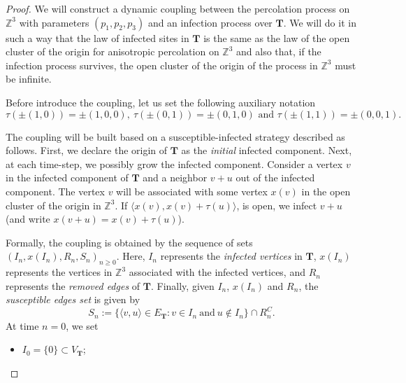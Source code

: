 \documentclass[10pt,a4paper]{amsart}
\newcommand{\Z}{\mathbb{Z}}
\begin{document}
\begin{proof}
We will construct a dynamic coupling between the percolation process on $\Z^{3}$ with parameters $(p_1,p_2, p_3)$  and an infection process over $\mathbf{T}$.  We will do it in such a way that the law of infected sites in $\mathbf{T}$ is the same as the law of the open cluster of the origin for anisotropic percolation on $\Z^3$ and also that, if the infection process survives, the open cluster of the origin of the process in $\Z^3$ must be infinite. 

Before introduce the coupling, let us set the following auxiliary notation
\begin{equation}\label{eq:tau}
\tau(\pm(1,0))=\pm (1,0,0), \: \tau(\pm(0,1))=\pm (0,1,0) \mbox{ and } \tau(\pm(1,1))=\pm (0,0,1) .
\end{equation}

The coupling will be built based on a susceptible-infected strategy described as follows. First, we declare  the origin of $\mathbf{T}$ as the \textit{initial} infected component. Next, at each time-step, we possibly grow the infected component. %
Consider a vertex $v$ in the infected component of $\mathbf{T}$ and a neighbor $v+u$ out of the infected component. The vertex $v$ will be associated with some vertex $x(v)$ in the  open cluster of the origin in $\Z^3$. If $\langle x(v), x(v)+\tau(u) \rangle$,  is open, we infect $v+u$  (and write $x(v+u) = x(v) + \tau(u)$).





Formally, the coupling is obtained by the sequence of sets $(I_n, x(I_n), R_n, S_n)_{n \geq 0}$. Here, $I_n$ represents the \textit{infected vertices} in $\mathbf{T}$, $x(I_n)$ represents the vertices in $\Z^{3}$ associated with the infected vertices, and $R_n$ represents the \textit{removed edges} of $\mathbf{T}$. Finally, given $I_n$, $x(I_n)$ and $R_n$, the \textit{susceptible edges set} is given by
\begin{equation*}
    S_{n} := \{ \langle v, u \rangle \in E_{\mathbf{T}}: v \in I_{n} \: \mbox{and} \: u \notin I_{n} \} \cap R_{n}^C.
\end{equation*}
At time $n=0$, we set
\begin{itemize}
    \item $I_0 = \{0\} \subset V_{\mathbf{T}}$; 
    

\end{itemize}
\end{proof}
\end{document}
